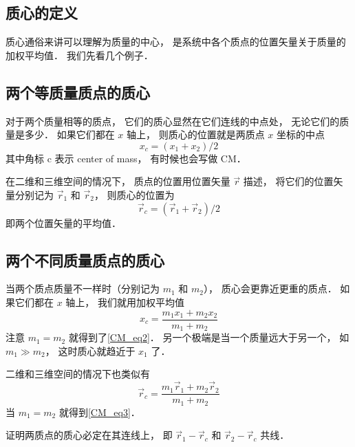 

\subsection{质心的定义}
质心通俗来讲可以理解为质量的中心， 是系统中各个质点的位置矢量关于质量的加权平均值． 我们先看几个例子．

\subsection{两个等质量质点的质心}
对于两个质量相等的质点， 它们的质心显然在它们连线的中点处， 无论它们的质量是多少． 如果它们都在 $x$ 轴上， 则质心的位置就是两质点 $x$ 坐标的中点
\begin{equation}\label{CM_eq2}
x_c = (x_1 + x_2)/2
\end{equation}
其中角标 c 表示 center of mass， 有时候也会写做 CM．

在二维和三维空间的情况下， 质点的位置用位置矢量 $\vec r$ 描述， 将它们的位置矢量分别记为 $\vec r_1$ 和 $\vec r_2$， 则质心的位置为
\begin{equation}\label{CM_eq3}
\vec r_c = (\vec r_1 + \vec r_2)/2
\end{equation}
即两个位置矢量的平均值． %

\subsection{两个不同质量质点的质心}
当两个质点质量不一样时（分别记为 $m_1$ 和 $m_2$）， 质心会更靠近更重的质点． 如果它们都在 $x$ 轴上， 我们就用加权平均值
\begin{equation}
x_c = \frac{m_1 x_1 + m_2 x_2}{m_1 + m_2}
\end{equation}
注意 $m_1 = m_2$ 就得到了\autoref{CM_eq2}． 另一个极端是当一个质量远大于另一个， 如 $m_1 \gg m_2$， 这时质心就趋近于 $x_1$ 了．

二维和三维空间的情况下也类似有
\begin{equation}\label{CM_eq5}
\vec r_c = \frac{m_1 \vec r_1 + m_2 \vec r_2}{m_1 + m_2}
\end{equation}
当 $m_1 = m_2$ 就得到\autoref{CM_eq3}．

\begin{exer}{}
证明两质点的质心必定在其连线上， 即 $\vec r_1 - \vec r_c$ 和 $\vec r_2 - \vec r_c$ 共线．%
\end{exer}


